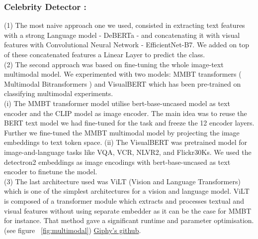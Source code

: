 \documentclass[11pt]{article}
\begin{document}
\subsubsection{Celebrity Detector :}
(1) The most naive approach one we used, consisted in extracting text features with a strong Language model - DeBERTa - and concatenating it with visual features with Convolutional Neural Network - EfficientNet-B7. We added on top of these concatenated features a Linear Layer to predict the class. \\
(2) The second approach was based on fine-tuning the whole image-text multimodal model. We experimented with two models: MMBT transformers ( Multimodal Bitransformers ) \cite{kiela2019supervised} and VisualBERT \cite{li2019visualbert} which has been pre-trained on classifying multimodal experiments.\\
(i) The MMBT transformer model utilise bert-base-uncased model as text encoder and the CLIP model \cite{https://doi.org/10.48550/arxiv.2103.00020} as image encoder. The main idea was to reuse the BERT text model we had fine-tuned for the task and freeze the 12 encoder layers. Further we fine-tuned the MMBT multimodal model by projecting the image embeddings to text token space. (ii) The VisualBERT was pretrained model \cite{li2019visualbert} for image-and-language tasks like VQA, VCR, NLVR2, and Flickr30Ks. We used the detectron2 embeddings \cite{ren2015faster} as image encodings with bert-base-uncased as text encoder to finetune the model. \\
(3) The last architecture used was ViLT \cite{kim2021vilt} (Vision and Language Transformers) which is one of the simplest architectures for a vision and language model.  ViLT is composed of a transformer module which extracts and processes textual and visual features without using separate embedder as it can be the case for MMBT for instance. That method gave a significant runtime and parameter optimisation. (see figure ~\ref{fig:multimodal}) \href{https://github.com/Giphy/celeb-detection-oss}{Giphy's github}.
\end{document}
